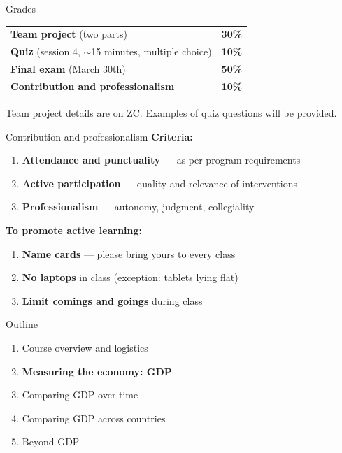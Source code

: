 \documentclass[aspectratio=169]{beamer}
\begin{document}
\begin{frame}{Grades}
   \vspace{0.3cm}
   \begin{tabular}{l r}
      \textbf{Team project} (two parts) & \textbf{30\%} \\[0.2cm]
      \textbf{Quiz} (session 4, $\sim$15 minutes, multiple choice) & \textbf{10\%} \\[0.2cm]
      \textbf{Final exam} (March 30th) & \textbf{50\%} \\[0.2cm]
      \textbf{Contribution and professionalism} & \textbf{10\%} \\
   \end{tabular}
   \vspace{0.4cm}
   \begin{defbox}[Details]
      Team project details are on ZC. Examples of quiz questions will be provided.
   \end{defbox}
\end{frame}

\begin{frame}{Contribution and professionalism}
   \small
   \textbf{Criteria:}
   \vspace{0.15cm}
   \begin{enumerate}
      \setlength\itemsep{0.2cm}
      \item \textbf{Attendance and punctuality} --- as per program requirements
      \item \textbf{Active participation} --- quality and relevance of interventions
      \item \textbf{Professionalism} --- autonomy, judgment, collegiality
   \end{enumerate}
   \vspace{0.4cm}
   \textbf{To promote active learning:}
   \vspace{0.15cm}
   \begin{enumerate}
      \setlength\itemsep{0.2cm}
      \item \textbf{Name cards} --- please bring yours to every class
      \item \textbf{No laptops} in class (exception: tablets lying flat)
      \item \textbf{Limit comings and goings} during class
   \end{enumerate}
\end{frame}

\begin{frame}{Outline}
   \begin{enumerate}
      \setlength\itemsep{0.35cm}
      \item {\color{gray!50}Course overview and logistics}
      \item \textbf{Measuring the economy: GDP}
      \item Comparing GDP over time
      \item Comparing GDP across countries
      \item Beyond GDP
   \end{enumerate}
\end{frame}
\end{document}
